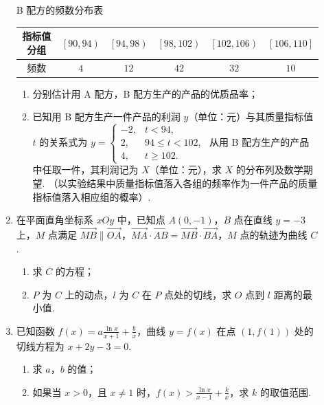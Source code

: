 \begin{description}
\begin{enumerate}[leftmargin=5pt]
\begin{center}
B 配方的频数分布表

\begin{tabular}{c|c|c|c|c|c}
\hline
指标值分组 & \(\left[90,94\right)\) & \(\left[94,98\right)\) & \(\left[98,102\right)\) & \(\left[102,106\right)\) & \(\left[106,110\right]\) \\
\hline
频数 & \(4\) & \(12\) & \(42\) & \(32\) & \(10\) \\
\hline
\end{tabular}
\end{center}

\begin{enumerate}
\item 分别估计用 A 配方，B 配方生产的产品的优质品率；
\item 已知用 B 配方生产一件产品的利润 \(y\)（单位：元）与其质量指标值 \(t\) 的关系式为 \( y = \begin{cases}
-2, & t < 94,\\
2, & 94 \leqslant t < 102,\\
4, & t \geqslant 102.
\end{cases} \) 从用 B 配方生产的产品中任取一件，其利润记为 \(X\)（单位：元），求 \(X\) 的分布列及数学期望. （以实验结果中质量指标值落入各组的频率作为一件产品的质量指标值落入相应组的概率）.
\end{enumerate}

        \item 在平面直角坐标系 \(xOy\) 中，已知点 \(A\left(0, -1\right)\)，\(B\) 点在直线 \(y = -3\) 上，\(M\) 点满足 \(\overrightarrow{MB} \parallel \overrightarrow{OA}\)，\(\overrightarrow{MA} \cdot \overrightarrow{AB} = \overrightarrow{MB} \cdot \overrightarrow{BA}\)，\(M\) 点的轨迹为曲线 \(C\).
\begin{enumerate}
\item 求 \(C\) 的方程；
\item \(P\) 为 \(C\) 上的动点，\(l\) 为 \(C\) 在 \(P\) 点处的切线，求 \(O\) 点到 \(l\) 距离的最小值.
\end{enumerate}

        \item 已知函数 \( f(x) = a \frac{\ln x}{x + 1} + \frac{b}{x} \)，曲线 \( y = f(x) \) 在点 \(\left(1, f(1)\right)\) 处的切线方程为 \( x + 2y - 3 = 0 \).
\begin{enumerate}
    \item 求 \(a\)，\(b\) 的值；
\item 如果当 \(x > 0\)，且 \(x \neq 1\) 时，\(f(x) > \frac{\ln x}{x - 1} + \frac{k}{x}\)，求 \(k\) 的取值范围.
\end{enumerate}


\end{enumerate}
\end{description}
